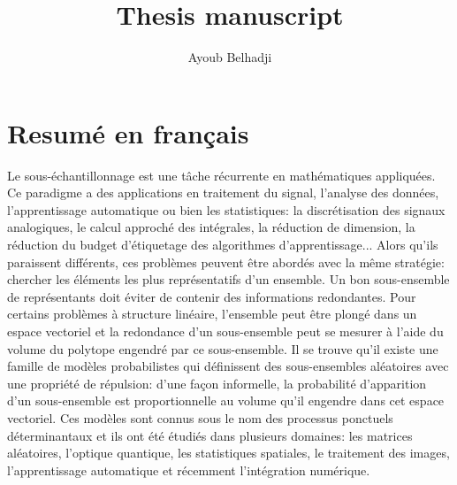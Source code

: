 \documentclass[twoside,11pt]{book}
\numberwithin{theorem}{chapter}
\numberwithin{definition}{chapter}
\numberwithin{proposition}{chapter}
\numberwithin{corollary}{chapter}
\numberwithin{example}{chapter}
\numberwithin{lemma}{chapter}
\numberwithin{assumption}{chapter}
\numberwithin{equation}{chapter}
\numberwithin{figure}{chapter}
\begin{document}
\title{Thesis manuscript}

%
\author{Ayoub Belhadji} %
 









\section{Resumé en français}\label{chap:introduction}
Le sous-échantillonnage est une tâche récurrente en mathématiques appliquées. Ce paradigme a des applications en traitement du signal, l'analyse des données, l'apprentissage automatique ou bien les statistiques: la discrétisation des signaux analogiques, le calcul approché des intégrales, la réduction de dimension, la réduction du budget d’étiquetage des algorithmes d'apprentissage... Alors qu'ils paraissent différents, ces problèmes peuvent être abordés avec la même stratégie: chercher les éléments les plus représentatifs d'un ensemble. 
Un bon sous-ensemble de représentants doit éviter de contenir des informations redondantes. Pour certains problèmes à structure linéaire, l'ensemble peut être plongé dans un espace vectoriel et la redondance d'un sous-ensemble peut se mesurer à l'aide du volume du polytope engendré par ce sous-ensemble. Il se trouve qu'il existe une famille de modèles probabilistes qui définissent des sous-ensembles aléatoires avec une propriété de répulsion: d'une façon informelle, la probabilité d'apparition d'un sous-ensemble est proportionnelle au volume qu'il engendre dans cet espace vectoriel. Ces modèles sont connus sous le nom des processus ponctuels déterminantaux et ils ont été étudiés dans plusieurs domaines: les matrices aléatoires, l'optique quantique, les statistiques spatiales, le traitement des images, l'apprentissage automatique et récemment l'intégration numérique.
\end{document}
